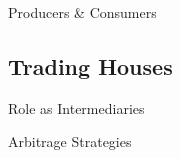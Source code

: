 \documentclass[10pt]{article}
\begin{document}
    \begin{core}{Producers \& Consumers}




    \end{core}

  \subsection{Trading Houses}

    \begin{core}{Role as Intermediaries}


    \end{core}

    \begin{core}{Arbitrage Strategies}


    \end{core}
\end{document}
